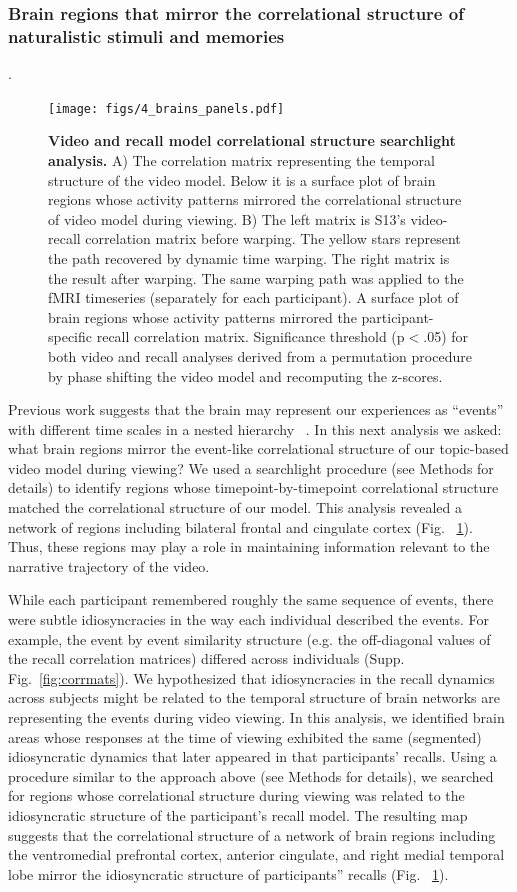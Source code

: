 \documentclass{article}
\begin{document}
\subsubsection{Brain regions that mirror the correlational structure of naturalistic stimuli and memories}.
\begin{figure}[t!]
\centering
\texttt{[image: figs/4\_brains\_panels.pdf]}
\caption{\small \textbf{Video and recall model correlational structure searchlight analysis.} A) The correlation matrix representing the temporal structure of the video model. Below it is a surface plot of brain regions whose activity patterns mirrored the correlational structure of video model during viewing.  B) The left matrix is S13's video-recall correlation matrix before warping. The yellow stars represent the path recovered by dynamic time warping. The right matrix is the result after warping. The same warping path was applied to the fMRI timeseries (separately for each participant). A surface plot of brain regions whose activity patterns mirrored the participant-specific recall correlation matrix. Significance threshold (p$<$.05) for both video and recall analyses derived from a permutation procedure by phase shifting the video model and recomputing the z-scores.}
\label{fig:brainz}
\end{figure}

Previous work suggests that the brain may represent our experiences as ``events'' with different time scales in a nested hierarchy ~\citep{LernEtal11, ChenEtal17, BaldEtal17}. In this next analysis we asked: what brain regions mirror the event-like correlational structure of our topic-based video model during viewing? We used a searchlight procedure (see Methods for details) to identify regions whose timepoint-by-timepoint correlational structure matched the correlational structure of our model. This analysis revealed a network of regions including bilateral frontal and cingulate cortex (Fig. ~\ref{fig:brainz}). Thus, these regions may play a role in maintaining information relevant to the narrative trajectory of the video.

While each participant remembered roughly the same sequence of events, there were subtle idiosyncracies in the way each individual described the events. For example, the event by event similarity structure (e.g. the off-diagonal values of the recall correlation matrices) differed across individuals (Supp. Fig.~\ref{fig:corrmats}). We hypothesized that idiosyncracies in the recall dynamics across subjects might be related to the temporal structure of brain networks are representing the events during video viewing. In this analysis, we identified brain areas whose responses at the time of viewing exhibited the same (segmented) idiosyncratic dynamics that later appeared in that participants’ recalls. Using a procedure similar to the approach above (see Methods for details), we searched for regions whose correlational structure during viewing was related to the idiosyncratic structure of the participant's recall model. The resulting map suggests that the correlational structure of a network of brain regions including the ventromedial prefrontal cortex, anterior cingulate, and right medial temporal lobe mirror the idiosyncratic structure of participants'' recalls (Fig. ~\ref{fig:brainz}).
\end{document}
